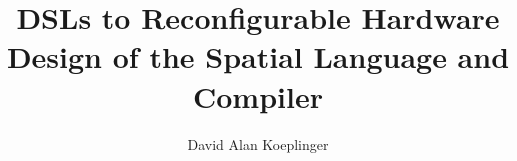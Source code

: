 \documentclass{report}
\begin{document}
\title{DSLs to Reconfigurable Hardware\\Design of the Spatial Language and Compiler}
\author{David Alan Koeplinger}
\end{document}

